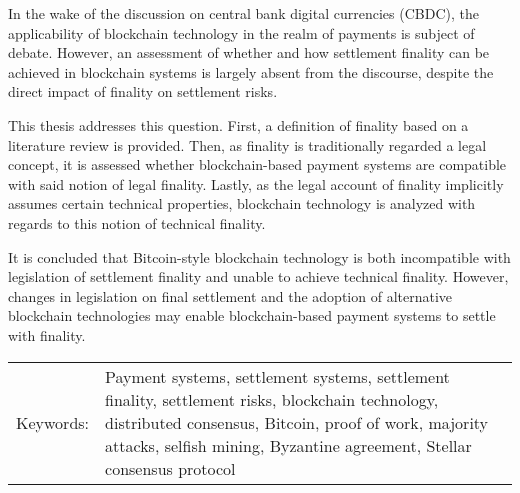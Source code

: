In the wake of the discussion on central bank digital currencies (CBDC), the applicability of blockchain technology in the realm of payments is subject of debate.
However, an assessment of whether and how settlement finality can be achieved in blockchain systems is largely absent from the discourse, despite the direct impact of finality on settlement risks.

This thesis addresses this question.
First, a definition of finality based on a literature review is provided.
Then, as finality is traditionally regarded a legal concept, it is assessed whether blockchain-based payment systems are compatible with said notion of legal finality.
Lastly, as the legal account of finality implicitly assumes certain technical properties, blockchain technology is analyzed with regards to this notion of technical finality.

It is concluded that Bitcoin-style blockchain technology is both incompatible with legislation of settlement finality and unable to achieve technical finality.
However, changes in legislation on final settlement and the adoption of alternative blockchain technologies may enable blockchain-based payment systems to settle with finality.




\vspace{1cm}

\begin{tabularx}{\textwidth}{@{}l X}
	Keywords: & Payment systems, settlement systems, settlement finality, settlement risks, blockchain technology, distributed consensus, Bitcoin, proof of work, majority attacks, selfish mining, Byzantine agreement, Stellar consensus protocol
\end{tabularx}
